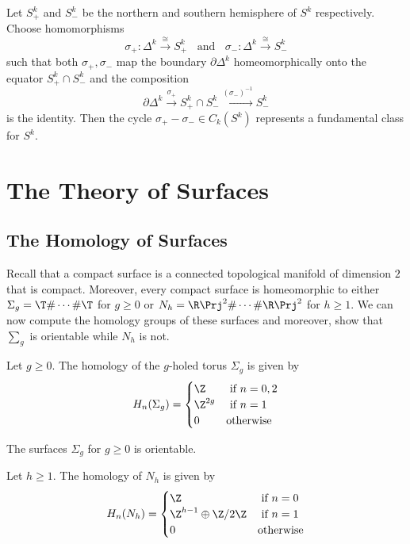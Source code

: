 \documentclass[a4paper]{article}
\begin{document}
\begin{crl}{}{} Let $S_+^k$ and $S_-^k$ be the northern and southern hemisphere of $S^k$ respectively. Choose homomorphisms $$\sigma_+:\Delta^k\overset{\cong}{\longrightarrow} S_+^k\;\;\text{ and }\;\;\sigma_-:\Delta^k\overset{\cong}{\longrightarrow} S_-^k$$ such that both $\sigma_+,\sigma_-$ map the boundary $\partial\Delta^k$ homeomorphically onto the equator $S_+^k\cap S_-^k$ and the composition $$\partial\Delta^k\overset{\sigma_+}{\longrightarrow}S_+^k\cap S_-^k\overset{(\sigma_-)^{-1}}{\longrightarrow}S_-^k$$ is the identity. Then the cycle $\sigma_+-\sigma_-\in C_k(S^k)$ represents a fundamental class for $S^k$. 
\end{crl}

\pagebreak
\section{The Theory of Surfaces}
\subsection{The Homology of Surfaces}
Recall that a compact surface is a connected topological manifold of dimension $2$ that is compact. Moreover, every compact surface is homeomorphic to either $\Sigma_g=\T\#\cdots\#\T$ for $g\geq 0$ or $N_h=\R\Prj^2\#\cdots\#\R\Prj^2$ for $h\geq 1$. We can now compute the homology groups of these surfaces and moreover, show that $\sum_g$ is orientable while $N_h$ is not. 

\begin{prp}{}{} Let $g\geq 0$. The homology of the $g$-holed torus $\Sigma_g$ is given by $$H_n(\Sigma_g)=\begin{cases}
\Z & \text{ if } n=0,2\\
\Z^{2g} & \text{ if } n=1\\
0 & \text{otherwise}
\end{cases}$$
\end{prp}

\begin{crl}{}{} The surfaces $\Sigma_g$ for $g\geq 0$ is orientable. 
\end{crl}

\begin{prp}{}{} Let $h\geq 1$. The homology of $N_h$ is given by $$H_n(N_h)=\begin{cases}
\Z & \text{ if } n=0\\
\Z^{h-1}\oplus\Z/2\Z & \text{ if } n=1\\
0 & \text{otherwise}
\end{cases}$$
\end{prp}
\end{document}
